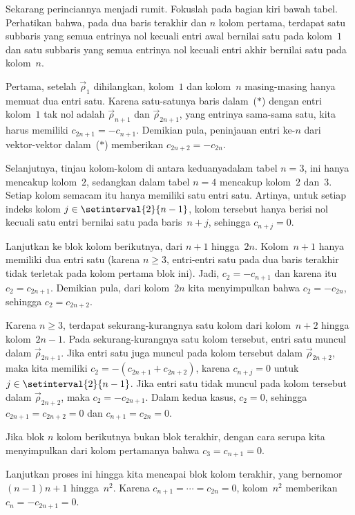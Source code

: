 Sekarang perinciannya menjadi rumit.
Fokuslah pada bagian kiri bawah tabel.
Perhatikan bahwa, pada dua baris terakhir dan $n$ kolom pertama, terdapat satu
subbaris yang semua entrinya nol kecuali entri awal bernilai satu pada kolom~$1$
dan satu subbaris yang semua entrinya nol kecuali entri akhir bernilai satu
pada kolom~$n$.

Pertama, setelah $\vec{\rho}_1$ dihilangkan, kolom~$1$ dan kolom~$n$
masing-masing hanya memuat dua entri satu.
Karena satu-satunya baris dalam~($*$) dengan entri kolom~$1$ tak nol adalah
$\vec{\rho}_{n+1}$ dan $\vec{\rho}_{2n+1}$, yang entrinya sama-sama satu, kita
harus memiliki $c_{2n+1}=-c_{n+1}$.
Demikian pula, peninjauan entri ke-$n$ dari vektor-vektor dalam~($*$)
memberikan $c_{2n+2}=-c_{2n}$.

Selanjutnya, tinjau kolom-kolom di antara keduanya\Dash dalam tabel $n=3$,
ini hanya mencakup kolom~$2$, sedangkan dalam tabel $n=4$ mencakup kolom~$2$
dan~$3$. Setiap kolom semacam itu hanya memiliki satu entri satu.
Artinya, untuk setiap indeks kolom $j\in\setinterval{2}{n-1}$, kolom tersebut
hanya berisi nol kecuali satu entri bernilai satu pada baris~$n+j$, sehingga
$c_{n+j}=0$.

Lanjutkan ke blok kolom berikutnya, dari $n+1$ hingga~$2n$.
Kolom~$n+1$ hanya memiliki dua entri satu (karena $n\geq 3$, entri-entri satu
pada dua baris terakhir tidak terletak pada kolom pertama blok ini).
Jadi, $c_2=-c_{n+1}$ dan karena itu $c_2=c_{2n+1}$.
Demikian pula, dari kolom~$2n$ kita menyimpulkan bahwa $c_2=-c_{2n}$,
sehingga $c_2=c_{2n+2}$.

Karena $n\geq 3$, terdapat sekurang-kurangnya satu kolom dari kolom~$n+2$
hingga kolom~$2n-1$.
Pada sekurang-kurangnya satu kolom tersebut, entri satu muncul dalam
$\vec{\rho}_{2n+1}$.
Jika entri satu juga muncul pada kolom tersebut dalam $\vec{\rho}_{2n+2}$,
maka kita memiliki $c_2=-(c_{2n+1}+c_{2n+2})$, karena $c_{n+j}=0$ untuk
$j\in\setinterval{2}{n-1}$.
Jika entri satu tidak muncul pada kolom tersebut dalam $\vec{\rho}_{2n+2}$,
maka $c_2=-c_{2n+1}$.
Dalam kedua kasus, $c_2=0$, sehingga $c_{2n+1}=c_{2n+2}=0$ dan
$c_{n+1}=c_{2n}=0$.

Jika blok $n$ kolom berikutnya bukan blok terakhir, dengan cara serupa kita
menyimpulkan dari kolom pertamanya bahwa $c_3=c_{n+1}=0$.

Lanjutkan proses ini hingga kita mencapai blok kolom terakhir, yang bernomor
$(n-1)n+1$ hingga~$n^2$.
Karena $c_{n+1}=\cdots=c_{2n}=0$, kolom~$n^2$ memberikan
$c_n=-c_{2n+1}=0$.

